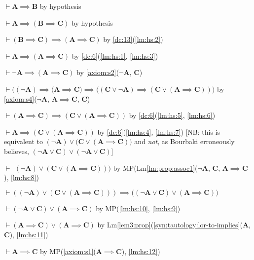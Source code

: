 \documentclass{amsart}%
\newcommand\metavariable[1]{\boldsymbol{#1}}
\begin{document}
\begin{pf}
\item\label{lm:hs:1} $\vdash\metavariable{A}\implies\metavariable{B}$
  by hypothesis
\item\label{lm:hs:2} $\vdash\metavariable{A}\implies(\metavariable{B}\implies\metavariable{C})$
  by hypothesis
\item\label{lm:hs:3} $\vdash(\metavariable{B}\implies\metavariable{C})\implies(\metavariable{A}\implies\metavariable{C})$
  by \ref{dc:13}(\ref{lm:hs:2})
\item\label{lm:hs:4} $\vdash\metavariable{A}\implies(\metavariable{A}\implies\metavariable{C})$
  by \ref{dc:6}(\ref{lm:hs:1}, \ref{lm:hs:3})
\item\label{lm:hs:5} $\vdash\neg\metavariable{A}\implies(\metavariable{A}\implies\metavariable{C})$
  by \ref{axiom:s2}($\neg\metavariable{A}$, $\metavariable{C}$)
\item\label{lm:hs:6} $\vdash\bigl((\neg\metavariable{A})\implies(\metavariable{A}\implies\metavariable{C}\bigr)\implies\bigl((\metavariable{C}\lor\neg\metavariable{A})\implies(\metavariable{C}\lor(\metavariable{A}\implies\metavariable{C}))\bigr)$
  by \ref{axiom:s4}($\neg\metavariable{A}$, $\metavariable{A}\implies\metavariable{C}$, $\metavariable{C}$)
\item\label{lm:hs:7} $\vdash(\metavariable{A}\implies\metavariable{C})\implies(\metavariable{C}\lor(\metavariable{A}\implies\metavariable{C}))$
  by \ref{dc:6}(\ref{lm:hs:5}, \ref{lm:hs:6})
\item\label{lm:hs:8} $\vdash\metavariable{A}\implies(\metavariable{C}\lor(\metavariable{A}\implies\metavariable{C}))$
  by \ref{dc:6}(\ref{lm:hs:4}, \ref{lm:hs:7})
[NB: this is equivalent to $(\neg\metavariable{A})\lor\bigl(\metavariable{C}\lor(\metavariable{A}\implies\metavariable{C})\bigr)$
and \emph{not}, as Bourbaki erroneously believes, $(\neg\metavariable{A}\lor\metavariable{C})\lor(\neg\metavariable{A}\lor\metavariable{C})$]
\item\label{lm:hs:9} $\vdash\phantom{(}(\neg\metavariable{A})\lor(\metavariable{C}\lor(\metavariable{A}\implies\metavariable{C})))$
  by MP(Lm\ref{lm:prop:assoc1}($\neg\metavariable{A}$, $\metavariable{C}$, $\metavariable{A}\implies\metavariable{C}$), \ref{lm:hs:8})
\item\label{lm:hs:10} $\vdash((\neg\metavariable{A})\lor(\metavariable{C}\lor(\metavariable{A}\implies\metavariable{C})))\implies\bigl((\neg\metavariable{A}\lor\metavariable{C})\lor(\metavariable{A}\implies\metavariable{C})\bigr)$
\item\label{lm:hs:11} $\vdash(\neg\metavariable{A}\lor\metavariable{C})\lor(\metavariable{A}\implies\metavariable{C})$
  by MP(\ref{lm:hs:10}, \ref{lm:hs:9})
\item\label{lm:hs:12} $\vdash(\metavariable{A}\implies\metavariable{C})\lor(\metavariable{A}\implies\metavariable{C})$
  by Lm\ref{lem3:prop}(\ref{syn:tautology:lor-to-implies}($\metavariable{A}$, $\metavariable{C}$), \ref{lm:hs:11})
\item $\vdash\metavariable{A}\implies\metavariable{C}$
  by MP(\ref{axiom:s1}($\metavariable{A}\implies\metavariable{C}$), \ref{lm:hs:12})
\end{pf}
\end{document}
